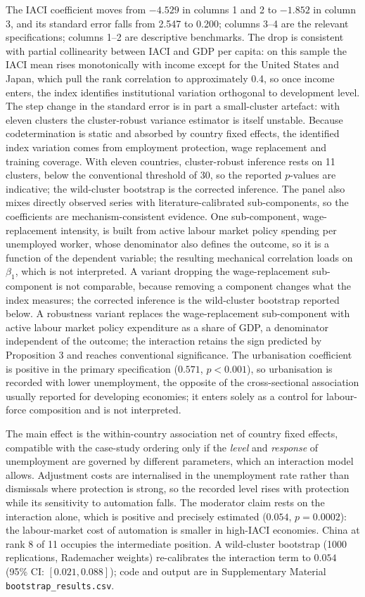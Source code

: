 \documentclass[12pt]{article}
\begin{document}
The IACI coefficient moves from $-4.529$ in columns 1 and 2 to $-1.852$ in column 3, and its standard error falls from 2.547 to 0.200; columns 3--4 are the relevant specifications; columns 1--2 are descriptive benchmarks. The drop is consistent with partial collinearity between IACI and GDP per capita: on this sample the IACI mean rises monotonically with income except for the United States and Japan, which pull the rank correlation to approximately 0.4, so once income enters, the index identifies institutional variation orthogonal to development level. The step change in the standard error is in part a small-cluster artefact: with eleven clusters the cluster-robust variance estimator is itself unstable. Because codetermination is static and absorbed by country fixed effects, the identified index variation comes from employment protection, wage replacement and training coverage. With eleven countries, cluster-robust inference rests on 11 clusters, below the conventional threshold of 30, so the reported $p$-values are indicative; the wild-cluster bootstrap is the corrected inference. The panel also mixes directly observed series with literature-calibrated sub-components, so the coefficients are mechanism-consistent evidence. One sub-component, wage-replacement intensity, is built from active labour market policy spending per unemployed worker, whose denominator also defines the outcome, so it is a function of the dependent variable; the resulting mechanical correlation loads on $\beta_1$, which is not interpreted. A variant dropping the wage-replacement sub-component is not comparable, because removing a component changes what the index measures; the corrected inference is the wild-cluster bootstrap reported below. A robustness variant replaces the wage-replacement sub-component with active labour market policy expenditure as a share of GDP, a denominator independent of the outcome; the interaction retains the sign predicted by Proposition 3 and reaches conventional significance. The urbanisation coefficient is positive in the primary specification ($0.571$, $p<0.001$), so urbanisation is recorded with lower unemployment, the opposite of the cross-sectional association usually reported for developing economies; it enters solely as a control for labour-force composition and is not interpreted.

The main effect is the within-country association net of country fixed effects, compatible with the case-study ordering only if the \emph{level} and \emph{response} of unemployment are governed by different parameters, which an interaction model allows. Adjustment costs are internalised in the unemployment rate rather than dismissals where protection is strong, so the recorded level rises with protection while its sensitivity to automation falls. The moderator claim rests on the interaction alone, which is positive and precisely estimated ($0.054$, $p=0.0002$): the labour-market cost of automation is smaller in high-IACI economies. China at rank 8 of 11 occupies the intermediate position. A wild-cluster bootstrap (1000 replications, Rademacher weights) re-calibrates the interaction term to $0.054$ (95\% CI: $[0.021, 0.088]$); code and output are in Supplementary Material \texttt{bootstrap\_results.csv}.
\end{document}
